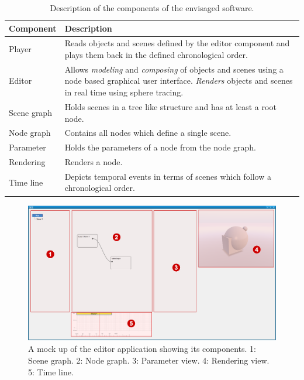\documentclass[%
    a4paper,    %
    justified,  %
    nobib,      %
    openany     %
]{tufte-book}
\begin{document}
\begin{table}[h]
  \begin{tabularx}{\textwidth}{lX}
    \toprule
    \textbf{Component} & \textbf{Description} \\
    \midrule
    Player & Reads objects and scenes defined by the editor component and plays
    them back in the defined chronological order.\\
    Editor & Allows \textit{modeling} and \textit{composing} of objects and
    scenes using a node based graphical user interface. \textit{Renders} objects
    and scenes in real time using sphere tracing. \\
    \midrule
    Scene graph & Holds scenes in a tree like structure and has at least a root
    node.\\
    Node graph & Contains all nodes which define a single scene.\\
    Parameter & Holds the parameters of a node from the node graph.\\
    Rendering & Renders a node.\\
    Time line & Depicts temporal events in terms of scenes which follow a
    chronological order.\\
    \bottomrule
  \end{tabularx}
  \caption{Description of the components of the envisaged software.}
  \label{table:software-components}
\end{table}

\begin{figure}[ht]
  \caption{%
    A mock up of the editor application showing its components.\newline{}
    1: Scene graph.\newline{}
    2: Node graph.\newline{}
    3: Parameter view.\newline{}
    4: Rendering view.\newline{}
    5: Time line.
  }
  \label{fig:editor-components}
  \includegraphics[width=0.95\linewidth]{images/editor-components}
\end{figure}
\end{document}
